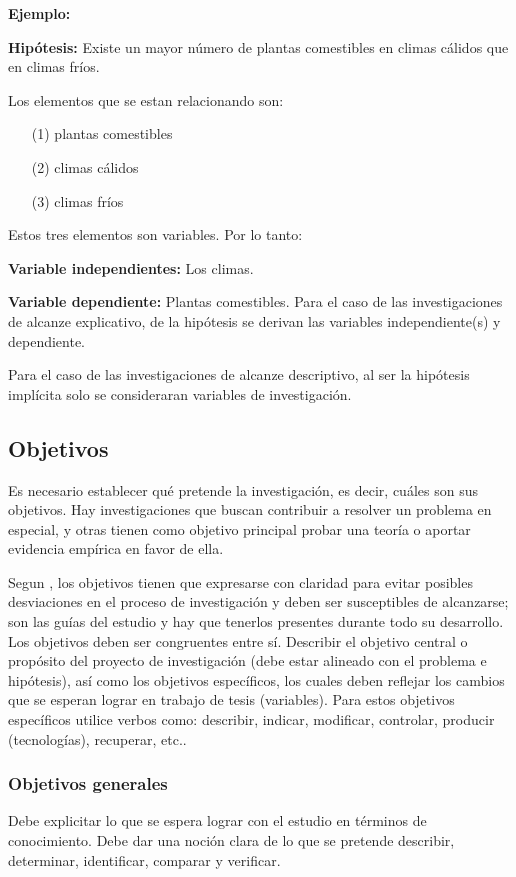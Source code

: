 \documentclass[a4paper, 12pt]{article}
\begin{document}
{\bf Ejemplo:} \cite{Erica}\par 
\vskip 0.2cm
{\bf Hipótesis:} Existe un mayor número de plantas comestibles en climas cálidos que en climas fríos. \par 
\vskip 0.2cm
Los elementos que se estan relacionando son: \par 
\begin{enumerate}
\item [(1)] plantas comestibles
\item[(2)] climas cálidos
\item[(3)] climas fríos
\end{enumerate} 
Estos tres elementos son variables. Por lo tanto:

{\bf Variable independientes:} Los climas.
\vskip 0.2cm

{\bf Variable dependiente:} Plantas comestibles.
\vskip 0.3cm
Para el caso de las investigaciones de alcanze explicativo, de la hipótesis se derivan las variables independiente(s) y dependiente.\par
\vskip 0.3cm
Para el caso de las investigaciones de alcanze descriptivo, al ser la hipótesis implícita solo se consideraran variables de investigación.\par
\vskip 0.3cm


\subsection{Objetivos}
Es necesario establecer qué pretende la investigación, es decir, cuáles son sus objetivos. Hay investigaciones que buscan contribuir a resolver un problema en especial, y otras tienen como objetivo principal probar una teoría o aportar evidencia empírica en favor de ella. \par 
\vskip 0.3cm
Segun \cite{Rojas}, los objetivos tienen que expresarse con claridad para evitar posibles desviaciones en el proceso de investigación y deben ser susceptibles de alcanzarse; son las guías del estudio y hay que tenerlos presentes durante todo su desarrollo. Los objetivos deben ser congruentes entre sí.
\vskip 0.3cm
Describir el objetivo central o propósito del proyecto de investigación (debe estar alineado con el problema e hipótesis), así como los objetivos específicos, los cuales deben reflejar los cambios que se esperan lograr en trabajo de tesis (variables). Para estos objetivos específicos utilice verbos como: describir, indicar, modificar, controlar, producir (tecnologías), recuperar, etc..

\subsubsection{Objetivos generales}
Debe explicitar lo que se espera lograr con el estudio en términos de conocimiento. Debe dar una noción clara de lo que se pretende describir, determinar, identificar, comparar y verificar.
\end{document}
